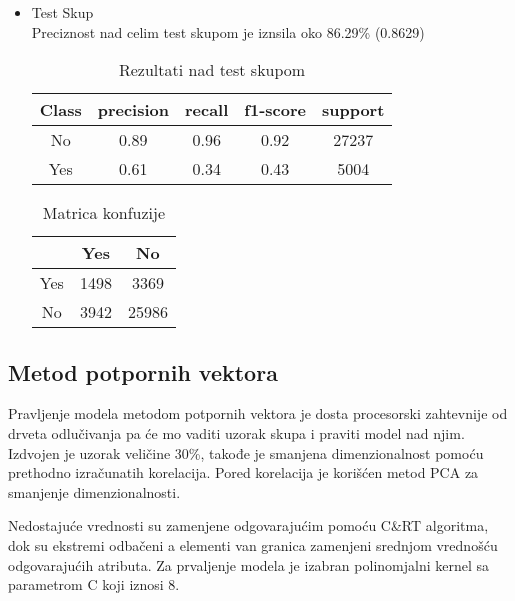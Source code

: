 \documentclass[a4paper]{article}
\begin{document}
\begin{itemize}
    \item Test Skup\\
        Preciznost nad celim test skupom je iznsila oko 86.29\% (0.8629) 
    \begin{table}[H]
        \begin{center}
        \caption{Rezultati nad test skupom}
        \label{tab:DT-Test}
        \begin{tabular}{|c|c|c|c|c|} \hline
        \textbf{Class} & \textbf{precision} & \textbf{recall}  & \textbf{f1-score} & \textbf{support} \\ \hline
        No & 0.89   &   0.96  &    0.92    & 27237\\ \hline
        Yes &  0.61  &    0.34   &   0.43    &  5004\\ \hline
        \end{tabular}
        \end{center}
    \end{table}
    \begin{table}[H]
        \begin{center}
        \caption{Matrica konfuzije}
        \label{tab:DT-Test-CM}
        \begin{tabular}{|c|c|c|} \hline
        \textbf{} & \textbf{Yes} & \textbf{No} \\ \hline
        Yes &1498  &3369  \\ \hline
        No &  3942 &25986 \\ \hline
        \end{tabular}
        \end{center}
    \end{table}
\end{itemize}




\subsection{Metod potpornih vektora}
\label{SVM}
Pravljenje modela metodom potpornih vektora je dosta procesorski zahtevnije od drveta odlučivanja pa će mo vaditi uzorak skupa i praviti model nad njim. Izdvojen je uzorak veličine 30\%, takođe je smanjena dimenzionalnost pomoću prethodno izračunatih korelacija. Pored korelacija je korišćen metod PCA za smanjenje dimenzionalnosti.\par
Nedostajuće vrednosti su zamenjene odgovarajućim pomoću C\&RT algoritma, dok su ekstremi odbačeni a elementi van granica zamenjeni srednjom vrednošću odgovarajućih atributa. Za prvaljenje modela je izabran polinomjalni kernel sa parametrom C koji iznosi 8.
\end{document}
